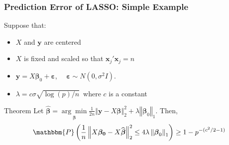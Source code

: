 \begin{frame}
  \frametitle{Prediction Error of LASSO: Simple Example}
  \begin{block}{Suppose that:}
    \begin{itemize}
      \item $X$ and $\mathbf{y}$ are centered
      \item $X$ is fixed and scaled so that $\mathbf{x}_j'\mathbf{x}_j = n$
      \item $\mathbf{y} = X\boldsymbol{\beta}_0 + \boldsymbol{\varepsilon}$, $\quad \boldsymbol{\varepsilon} \sim N(0,\sigma^2 I)$.
      \item $\lambda = c \sigma \sqrt{\log(p)/n}\,$ where $c$ is a constant
    \end{itemize}
  \end{block}

  \begin{alertblock}{Theorem}
    Let $\widehat{\boldsymbol{\beta}} = \underset{\boldsymbol{\beta}}{\arg \min} \frac{1}{2n} \left\Vert \mathbf{y} - X\boldsymbol{\beta}\right\Vert_2^2 +  \lambda \left\Vert \boldsymbol{\beta}_0\right\Vert_1$.
    Then, 
    \[
      \mathbbm{P}\left(\frac{1}{n}\left\Vert X\boldsymbol{\beta_0} - X\widehat{\boldsymbol{\beta}} \right\Vert_2^2 \leq 4 \lambda \left \Vert \boldsymbol{\beta}_0 \right\Vert_1\right) \geq 1 - p^{-(c^2/2 - 1)}
    \]
  \end{alertblock}

\end{frame}
